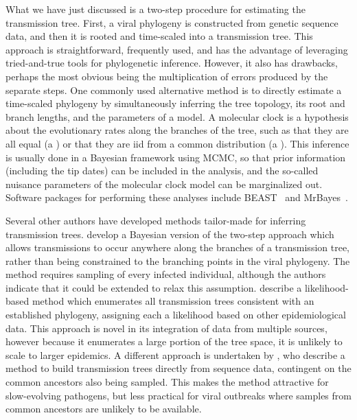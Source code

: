 What we have just discussed is a two-step procedure for estimating the
transmission tree. First, a viral phylogeny is constructed from genetic
sequence data, and then it is rooted and time-scaled into a transmission tree.
This approach is straightforward, frequently used, and has the advantage of
leveraging tried-and-true tools for phylogenetic inference. However, it also
has drawbacks, perhaps the most obvious being the multiplication of errors
produced by the separate steps. One commonly used alternative method is to
directly estimate a time-scaled phylogeny by simultaneously inferring the tree
topology, its root and branch lengths, and the parameters of a  model. A molecular clock is a hypothesis about the evolutionary rates
along the branches of the tree, such as that they are all equal (a ) or that they are \gls{iid} from a common distribution (a ). This inference is usually done in a Bayesian framework using
\gls{MCMC}, so that prior information (including the tip dates)  can be included in the analysis, and the
so-called nuisance parameters of the molecular clock model can be marginalized
out. Software packages for performing these analyses include
BEAST~\autocite{bouckaert2014beast} and MrBayes~\autocite{ronquist2012mrbayes}.

Several other authors have developed methods tailor-made for inferring
transmission trees. \textcite{didelot2014bayesian} develop a Bayesian version
of the two-step approach which allows transmissions to occur anywhere along the
branches of a transmission tree, rather than being constrained to the branching
points in the viral phylogeny. The method requires sampling of every infected
individual, although the authors indicate that it could be extended to relax
this assumption. \textcite{cottam2008integrating} describe a likelihood-based
method which enumerates all transmission trees consistent with an established
phylogeny, assigning each a likelihood based on other epidemiological data. 
This approach is novel in its integration of data from multiple sources,
however because it enumerates a large portion of the tree space, it is unlikely
to scale to larger epidemics. A different approach is undertaken by
\textcite{jombart2011reconstructing}, who describe a method to build
transmission trees directly from sequence data, contingent on the common
ancestors also being sampled. This makes the method attractive for
slow-evolving pathogens, but less practical for viral outbreaks where samples
from common ancestors are unlikely to be available.

